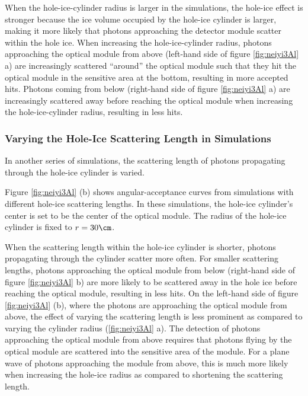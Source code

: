 When the hole-ice-cylinder radius is larger in the simulations, the hole-ice effect is stronger because the ice volume occupied by the hole-ice cylinder is larger, making it more likely that photons approaching the detector module scatter within the hole ice.
When increasing the hole-ice-cylinder radius, photons approaching the optical module from above (left-hand side of figure \ref{fig:neiyi3Al} a) are increasingly scattered ``around'' the optical module such that they hit the optical module in the sensitive area at the bottom, resulting in more accepted hits.
Photons coming from below (right-hand side of figure \ref{fig:neiyi3Al} a) are increasingly scattered away before reaching the optical module when increasing the hole-ice-cylinder radius, resulting in less hits.


\subsubsection{Varying the Hole-Ice Scattering Length in Simulations}
\label{sec:vary_sca}

In another series of simulations, the scattering length of photons propagating through the hole-ice cylinder is varied.


Figure \ref{fig:neiyi3Al} (b) shows angular-acceptance curves from simulations with different hole-ice scattering lengths. In these simulations, the hole-ice cylinder's center is set to be the center of the optical module. The radius of the hole-ice cylinder is fixed to $r = 30\cm$.

When the scattering length within the hole-ice cylinder is shorter, photons propagating through the cylinder scatter more often.
For smaller scattering lengths, photons approaching the optical module from below (right-hand side of figure \ref{fig:neiyi3Al} b) are more likely to be scattered away in the hole ice before reaching the optical module, resulting in less hits.
On the left-hand side of figure \ref{fig:neiyi3Al} (b), where the photons are approaching the optical module from above, the effect of varying the scattering length is less prominent as compared to varying the cylinder radius (\ref{fig:neiyi3Al} a). The detection of photons approaching the optical module from above requires that photons flying by the optical module are scattered into the sensitive area of the module. For a plane wave of photons approaching the module from above, this is much more likely when increasing the hole-ice radius as compared to shortening the scattering length.


